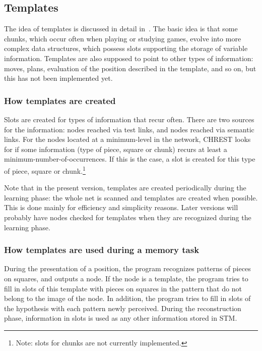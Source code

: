 \documentclass{article}
\begin{document}
\subsection{Templates}

The idea of templates is discussed in detail in~\cite{Gobet96b}.  The basic
idea is that some chunks, which occur often when playing or studying games,
evolve into more complex data structures, which possess slots supporting the
storage of variable information.  Templates are also supposed to point to other
types of information: moves, plans, evaluation of the position described in the
template, and so on, but this has not been implemented yet.

\subsubsection{How templates are created}

Slots are created for types of information that recur often. There are two
sources for the information: nodes reached via test links, and nodes reached
via semantic links.  For the nodes located at a minimum-level in the network,
CHREST looks for if some information (type of piece, square or chunk) recurs at
least a minimum-number-of-occurrences. If this is the case, a slot is created
for this type of piece, square or chunk.\footnote{Note: slots for chunks are
not currently implemented.}

Note that in the present version, templates are created periodically during 
the learning phase: the whole net is scanned and templates are created when 
possible. This is done mainly for efficiency and simplicity reasons. 
Later versions will probably have nodes checked for templates when they are 
recognized during the learning phase.

\subsubsection{How templates are used during a memory task}

During the presentation of a position, the program recognizes patterns of
pieces on squares, and outputs a node. If the node is a template, the program
tries to fill in slots of this template with pieces on squares in the pattern
that do not belong to the image of the node. In addition, the program tries to
fill in slots of the hypothesis with each pattern newly perceived. During the
reconstruction phase, information in slots is used as any other information
stored in STM.
\end{document}
